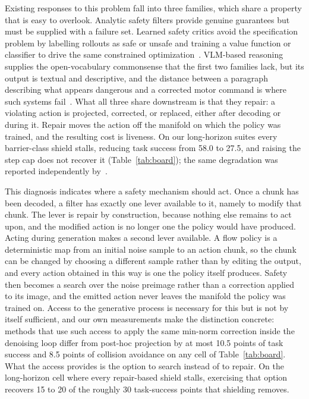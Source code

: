 \documentclass[conference]{IEEEtran}
\begin{document}
Existing responses to this problem fall into three families, which share a property that is easy to overlook. Analytic safety filters provide genuine guarantees but must be supplied with a failure set. Learned safety critics avoid the specification problem by labelling rollouts as safe or unsafe and training a value function or classifier to drive the same constrained optimization~\cite{safediffuser,pacs}. VLM-based reasoning supplies the open-vocabulary commonsense that the first two families lack, but its output is textual and descriptive, and the distance between a paragraph describing what appears dangerous and a corrected motor command is where such systems fail~\cite{brunke2025semantic,aegis}. What all three share downstream is that they repair: a violating action is projected, corrected, or replaced, either after decoding or during it. Repair moves the action off the manifold on which the policy was trained, and the resulting cost is liveness. On our long-horizon suites every barrier-class shield stalls, reducing task success from 58.0 to 27.5, and raising the step cap does not recover it (Table~\ref{tab:board}); the same degradation was reported independently by~\cite{pacs}. 

This diagnosis indicates where a safety mechanism should act. Once a chunk has been decoded, a filter has exactly one lever available to it, namely to modify that chunk. The lever is repair by construction, because nothing else remains to act upon, and the modified action is no longer one the policy would have produced. Acting during generation makes a second lever available. A flow policy is a deterministic map from an initial noise sample to an action chunk, so the chunk can be changed by choosing a different sample rather than by editing the output, and every action obtained in this way is one the policy itself produces. Safety then becomes a search over the noise preimage rather than a correction applied to its image, and the emitted action never leaves the manifold the policy was trained on. Access to the generative process is necessary for this but is not by itself sufficient, and our own measurements make the distinction concrete: methods that use such access to apply the same min-norm correction inside the denoising loop differ from post-hoc projection by at most 10.5 points of task success and 8.5 points of collision avoidance on any cell of Table~\ref{tab:board}. What the access provides is the option to search instead of to repair. On the long-horizon cell where every repair-based shield stalls, exercising that option recovers 15 to 20 of the roughly 30 task-success points that shielding removes.
\end{document}
